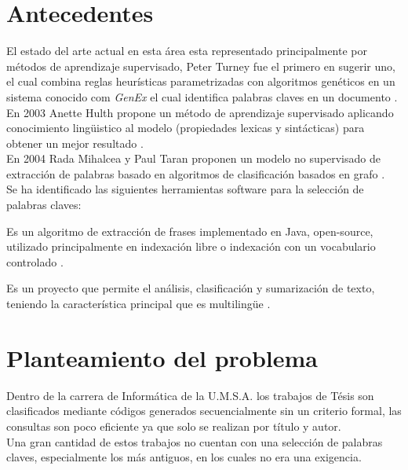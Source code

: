 \section{Antecedentes}
El estado del arte actual en esta \'area esta representado principalmente por
m\'etodos de aprendizaje supervisado, Peter Turney fue el primero en sugerir uno,
el cual combina reglas heur\'isticas parametrizadas con algoritmos gen\'eticos
en un sistema conocido com \emph{GenEx} el cual identifica palabras claves en un
documento \cite{PT99}. \\

En 2003 Anette Hulth propone un m\'etodo de aprendizaje supervisado aplicando
conocimiento ling\"uistico al modelo (propiedades lexicas y sint\'acticas) para obtener
un mejor resultado \cite{AH03}. \\

En 2004 Rada Mihalcea y Paul Taran proponen un modelo no supervisado de extracci\'on
de palabras basado en algoritmos de clasificaci\'on basados en grafo \cite{RMPT04}. \\

Se ha identificado las siguientes herramientas software para la selecci\'on de
palabras claves:
\begin{description}[leftmargin=0cm]
	\item[Kea] Es un algoritmo de extracci\'on de frases implementado en Java,
	open-source, utilizado principalmente en indexaci\'on libre  o indexaci\'on con
	un vocabulario controlado \cite{KEA}.
	\item[Texlexan] Es un proyecto que permite el an\'alisis, clasificaci\'on y
	sumarizaci\'on de texto, teniendo la caracter\'istica principal que es 
	multiling\"ue \cite{TEXLEXAN}.
\end{description}


\section{Planteamiento del problema}
Dentro de la carrera de Inform\'atica de la U.M.S.A. los trabajos de T\'esis son
clasificados mediante c\'odigos generados secuencialmente sin un criterio formal, las
consultas son poco eficiente ya que solo se realizan por t\'itulo y autor. \\

Una gran cantidad de estos trabajos no cuentan con una selecci\'on de palabras claves,
especialmente los m\'as antiguos, en los cuales no era una exigencia. \\

